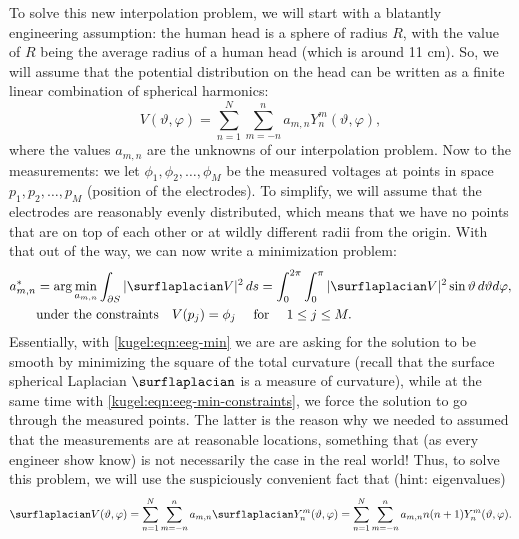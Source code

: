 To solve this new interpolation problem, we will start with a blatantly
engineering assumption: the human head is a sphere of radius $R$, with the value
of $R$ being the average radius of a human head (which is around 11 cm). So, we
will assume that the potential distribution on the head can be written as a
finite linear combination of spherical harmonics:
\begin{equation*}
  V(\vartheta, \varphi)
    = \sum_{n=1}^N \sum_{m=-n}^n a_{m,n} Y^m_n(\vartheta, \varphi),
\end{equation*}
where the values $a_{m,n}$ are the unknowns of our interpolation problem. Now to
the measurements: we let $\phi_1, \phi_2, \ldots, \phi_M$ be the measured voltages
at points in space $p_1, p_2, \ldots, p_M$ (position of the electrodes). To
simplify, we will assume that the electrodes are reasonably evenly distributed,
which means that we have no points that are on top of each other or at wildly
different radii from the origin. With that out of the way, we can now write a
minimization problem:
\begin{subequations}
  \begin{align}
    a_{m,n}^* &= \arg \min_{a_{m,n}}
      \int_{\partial S} | \surflaplacian V |^2 \, ds 
      = \int_0^{2\pi} \int_{0}^\pi | \surflaplacian V |^2
        \sin \vartheta \, d\vartheta d\varphi, 
        \label{kugel:eqn:eeg-min} \\
    &\text{under the constraints} \quad V(p_j) = \phi_j
      \quad \text{ for } \quad 1 \leq j \leq M.
      \label{kugel:eqn:eeg-min-constraints}
  \end{align}
\end{subequations}
Essentially, with \eqref{kugel:eqn:eeg-min} we are are asking for the solution
to be smooth by minimizing the square of the total curvature (recall that the
surface spherical Laplacian $\surflaplacian$ is a measure of curvature), while
at the same time with \eqref{kugel:eqn:eeg-min-constraints}, we force the
solution to go through the measured points. The latter is the reason why we
needed to assumed that the measurements are at reasonable locations, something
that (as every engineer show know) is not necessarily the case in the real
world! Thus, to solve this problem, we will use the suspiciously convenient fact
that (hint: eigenvalues)
\begin{equation*}
  \surflaplacian V(\vartheta, \varphi)
    = \sum_{n=1}^N \sum_{m=-n}^n a_{m,n}
      \surflaplacian Y^m_n(\vartheta, \varphi)
    = \sum_{n=1}^N \sum_{m=-n}^n a_{m,n}
      n(n+1) Y^m_n(\vartheta, \varphi).
\end{equation*}
